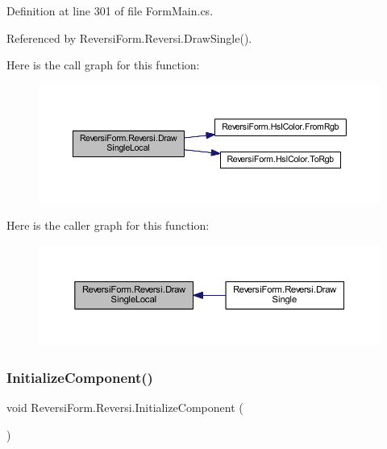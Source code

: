 Definition at line 301 of file Form\+Main.\+cs.



Referenced by Reversi\+Form.\+Reversi.\+Draw\+Single().

Here is the call graph for this function\+:\nopagebreak
\begin{figure}[H]
\begin{center}
\leavevmode
\includegraphics[width=350pt]{class_reversi_form_1_1_reversi_aaa7228857f9476b7950b0af1524abf44_cgraph}
\end{center}
\end{figure}
Here is the caller graph for this function\+:\nopagebreak
\begin{figure}[H]
\begin{center}
\leavevmode
\includegraphics[width=350pt]{class_reversi_form_1_1_reversi_aaa7228857f9476b7950b0af1524abf44_icgraph}
\end{center}
\end{figure}
\mbox{\label{class_reversi_form_1_1_reversi_abec0816dd006d05b512d86b45a20af68}} 
\subsubsection{\texorpdfstring{Initialize\+Component()}{InitializeComponent()}}
{\footnotesize\ttfamily void Reversi\+Form.\+Reversi.\+Initialize\+Component (\begin{DoxyParamCaption}{ }\end{DoxyParamCaption})\hspace{0.3cm}{\ttfamily [private]}}



